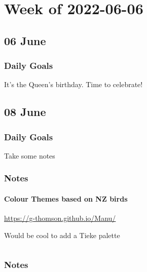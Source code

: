 \documentclass[weekly_log.tex]{subfiles}
\begin{document}
\chapter{Week of 2022-06-06}






\section{06 June}

\subsection{Daily Goals}
\begin{todolist}
    \item[\done] It's the Queen's birthday. Time to celebrate!
\end{todolist}




\section{08 June}

\subsection{Daily Goals}
\begin{todolist}
    \item[\done] Take some notes
\end{todolist}

\subsection{Notes}
\subsubsection{Colour Themes based on NZ birds}
\url{https://g-thomson.github.io/Manu/}

Would be cool to add a Tieke palette



\begin{verbatim}
\end{verbatim}


  
  


\subsection{Notes}

\bib{}
\end{document}
